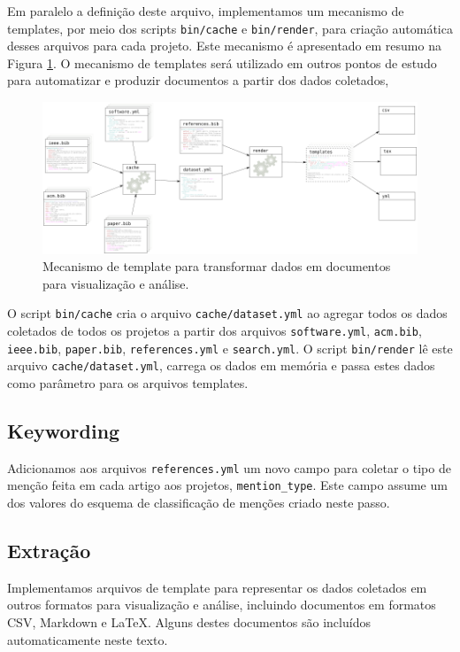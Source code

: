 Em paralelo a definição deste arquivo, implementamos um mecanismo de templates,
por meio dos scripts \texttt{bin/cache} e \texttt{bin/render}, para criação
automática desses arquivos para cada projeto. 
Este mecanismo é apresentado em resumo na Figura
\ref{template-fluxograma}.
O mecanismo de templates será
utilizado em outros pontos de estudo para automatizar e produzir documentos a
partir dos dados coletados, 

\begin{figure}[h]
  \center
  \includegraphics[scale=0.3]{imagens/template-fluxograma.png}
  \caption{Mecanismo de template para transformar dados em documentos para visualização e análise.}
  \label{template-fluxograma}
\end{figure}

O script \texttt{bin/cache} cria o arquivo \texttt{cache/dataset.yml} ao
agregar todos os dados coletados de todos os projetos a partir dos arquivos
\texttt{software.yml}, \texttt{acm.bib}, \texttt{ieee.bib}, \texttt{paper.bib},
\texttt{references.yml} e \texttt{search.yml}.
O script \texttt{bin/render} lê este arquivo \texttt{cache/dataset.yml},
carrega os dados em memória e passa estes dados como parâmetro para os arquivos
templates.

\subsection{Keywording}

Adicionamos aos arquivos \texttt{references.yml} um novo campo para coletar o
tipo de menção feita em cada artigo aos projetos, \texttt{mention\_type}. Este
campo assume um dos valores do esquema de classificação de menções criado neste passo.

\subsection{Extração}

Implementamos arquivos de template para representar os dados coletados em
outros formatos para visualização e análise, incluindo documentos em formatos
CSV, Markdown e \LaTeX. Alguns destes documentos são incluídos automaticamente
neste texto.

